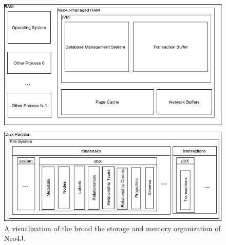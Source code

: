 \documentclass[a4paper,10pt]{article}
\begin{document}
\begin{figure}[htp]\label{N4J_memory_view}
 \begin{center}
  \includegraphics[keepaspectratio,width=\textwidth]{img/N4J_memory_view.png}
 \end{center}
 \caption{A visualization of the broad the storage and memory organization of Neo4J.} %
\end{figure}
\end{document}
